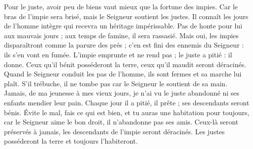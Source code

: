 Pour le juste, avoir peu de biens vaut mieux que la fortune des impies.
\versseparator
Car le bras de l'impie sera brisé, mais le Seigneur soutient les justes.
\versseparator
Il connaît les jours de l'homme intègre qui recevra un héritage impérissable.
\versseparator
Pas de honte pour lui aux mauvais jours ; aux temps de famine, il sera rassasié.
\versseparator
Mais oui, les impies disparaîtront comme la parure des prés ; c'en est fini des ennemis du Seigneur : ils s'en vont en fumée.
\versseparator
L'impie emprunte et ne rend pas ; le juste a pitié : il donne.
\versseparator
Ceux qu'il bénit posséderont la terre, ceux qu'il maudit seront déracinés.
\versseparator
Quand le Seigneur conduit les pas de l'homme, ils sont fermes et sa marche lui plaît.
\versseparator
S'il trébuche, il ne tombe pas car le Seigneur le soutient de sa main.
\versseparator
Jamais, de ma jeunesse à mes vieux jours, je n'ai vu le juste abandonné ni ses enfants mendier leur pain.
\versseparator
Chaque jour il a pitié, il prête ; ses descendants seront bénis.
\versseparator
Évite le mal, fais ce qui est bien, et tu auras une habitation pour toujours,
\versseparator
car le Seigneur aime le bon droit, il n'abandonne pas ses amis. Ceux-là seront préservés à jamais, les descendants de l'impie seront déracinés.
\versseparator
Les justes posséderont la terre et toujours l'habiteront.
